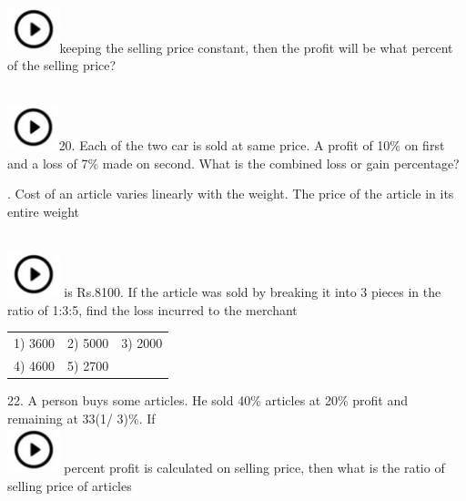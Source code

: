 \documentclass{article} %
\begin{document}
\noindent  
\noindent \\ \includegraphics*[width=0.60in, height=0.52in]{images/image1}keeping the selling price constant, then the profit will be what percent of the selling price?

\noindent 

\noindent  
\noindent \\ \includegraphics*[width=0.59in, height=0.52in]{images/image1}20. Each of the two car is sold at same price. A profit of 10\% on first and a loss of 7\% made on second. What is the combined loss or gain percentage?

\noindent 

\noindent 

\noindent 

. Cost of an article varies linearly with the weight. The price of the article in its entire weight

\noindent 

\noindent  
\noindent \\ \includegraphics*[width=0.60in, height=0.52in]{images/image1} is Rs.8100. If the article was sold by breaking it into 3 pieces in the ratio of 1:3:5, find the loss incurred to the merchant

\noindent 

\noindent 
\begin{tabular}{p{1.7in} p{1.6in} p{1.6in}} \\ 
	1) 3600                    &  2) 5000             &  3) 2000             \\
4) 4600             & 5) 2700 \\
\end{tabular}

\noindent 

22. A person buys some articles. He sold 40\% articles at 20\% profit and remaining at 33(1/  3)\%. If  
\noindent \\ \includegraphics*[width=0.60in, height=0.52in]{images/image1} percent profit is calculated on selling price, then what is the ratio of selling price of articles
\end{document}
